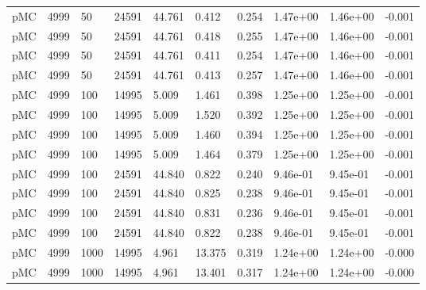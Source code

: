 \begin{tabular}{llllllllll}
 pMC &   4999 &         50 &       24591 &    44.761 &                        0.412 &          0.254 &         1.47e+00 &        1.46e+00 &       -0.001 \\
 pMC &   4999 &         50 &       24591 &    44.761 &                        0.418 &          0.255 &         1.47e+00 &        1.46e+00 &       -0.001 \\
 pMC &   4999 &         50 &       24591 &    44.761 &                        0.411 &          0.254 &         1.47e+00 &        1.46e+00 &       -0.001 \\
 pMC &   4999 &         50 &       24591 &    44.761 &                        0.413 &          0.257 &         1.47e+00 &        1.46e+00 &       -0.001 \\
 pMC &   4999 &        100 &       14995 &     5.009 &                        1.461 &          0.398 &         1.25e+00 &        1.25e+00 &       -0.001 \\
 pMC &   4999 &        100 &       14995 &     5.009 &                        1.520 &          0.392 &         1.25e+00 &        1.25e+00 &       -0.001 \\
 pMC &   4999 &        100 &       14995 &     5.009 &                        1.460 &          0.394 &         1.25e+00 &        1.25e+00 &       -0.001 \\
 pMC &   4999 &        100 &       14995 &     5.009 &                        1.464 &          0.379 &         1.25e+00 &        1.25e+00 &       -0.001 \\
 pMC &   4999 &        100 &       24591 &    44.840 &                        0.822 &          0.240 &         9.46e-01 &        9.45e-01 &       -0.001 \\
 pMC &   4999 &        100 &       24591 &    44.840 &                        0.825 &          0.238 &         9.46e-01 &        9.45e-01 &       -0.001 \\
 pMC &   4999 &        100 &       24591 &    44.840 &                        0.831 &          0.236 &         9.46e-01 &        9.45e-01 &       -0.001 \\
 pMC &   4999 &        100 &       24591 &    44.840 &                        0.822 &          0.238 &         9.46e-01 &        9.45e-01 &       -0.001 \\
 pMC &   4999 &       1000 &       14995 &     4.961 &                       13.375 &          0.319 &         1.24e+00 &        1.24e+00 &       -0.000 \\
 pMC &   4999 &       1000 &       14995 &     4.961 &                       13.401 &          0.317 &         1.24e+00 &        1.24e+00 &       -0.000 \\

\end{tabular}
